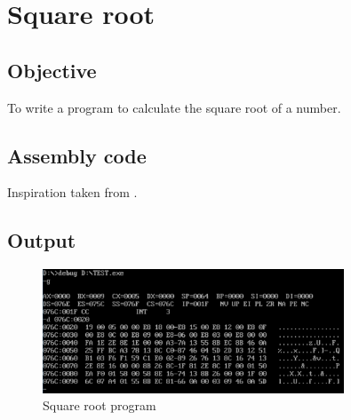 \section{Square root}

\subsection{Objective}

To write a program to calculate the square root of a number.

\subsection{Assembly code}


Inspiration taken from \cite{sqrt}.

\pagebreak
\subsection{Output}

\begin{figure}[ht]
	\centering
	\includegraphics[width=0.8\textwidth]{./res/practicals/sqrt.png}
	\caption{Square root program}
	\label{fig:sqrt}
\end{figure}
